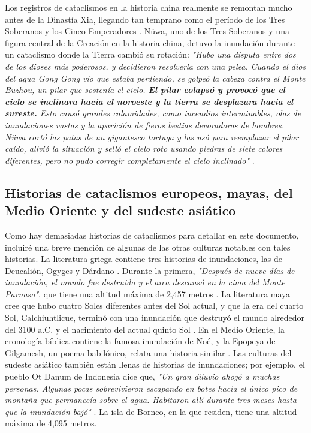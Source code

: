 \documentclass[10pt,twocolumn,letterpaper]{article}
\begin{document}
Los registros de cataclismos en la historia china realmente se remontan mucho antes de la Dinastía Xia, llegando tan temprano como el período de los Tres Soberanos y los Cinco Emperadores \cite{7}. Nüwa, uno de los Tres Soberanos y una figura central de la Creación en la historia china, detuvo la inundación durante un cataclismo donde la Tierra cambió su rotación: \textit{"Hubo una disputa entre dos de los dioses más poderosos, y decidieron resolverla con una pelea. Cuando el dios del agua Gong Gong vio que estaba perdiendo, se golpeó la cabeza contra el Monte Buzhou, un pilar que sostenía el cielo. \textbf{El pilar colapsó y provocó que el cielo se inclinara hacia el noroeste y la tierra se desplazara hacia el sureste.} Esto causó grandes calamidades, como incendios interminables, olas de inundaciones vastas y la aparición de fieros bestias devoradoras de hombres. Nüwa cortó las patas de un gigantesco tortuga y las usó para reemplazar el pilar caído, alivió la situación y selló el cielo roto usando piedras de siete colores diferentes, pero no pudo corregir completamente el cielo inclinado"} \cite{8}.

\subsection{Historias de cataclismos europeos, mayas, del Medio Oriente y del sudeste asiático}

Como hay demasiadas historias de cataclismos para detallar en este documento, incluiré una breve mención de algunas de las otras culturas notables con tales historias. La literatura griega contiene tres historias de inundaciones, las de Deucalión, Ogyges y Dárdano \cite{9,10}. Durante la primera, \textit{"Después de nueve días de inundación, el mundo fue destruido y el arca descansó en la cima del Monte Parnaso"}, que tiene una altitud máxima de 2,457 metros \cite{11}. La literatura maya cree que hubo cuatro Soles diferentes antes del Sol actual, y que la era del cuarto Sol, Calchiuhtlicue, terminó con una inundación que destruyó el mundo alrededor del 3100 a.C. y el nacimiento del actual quinto Sol \cite{12}. En el Medio Oriente, la cronología bíblica contiene la famosa inundación de Noé, y la Epopeya de Gilgamesh, un poema babilónico, relata una historia similar \cite{13}. Las culturas del sudeste asiático también están llenas de historias de inundaciones; por ejemplo, el pueblo Ot Danum de Indonesia dice que, \textit{"Un gran diluvio ahogó a muchas personas. Algunas pocas sobrevivieron escapando en botes hacia el único pico de montaña que permanecía sobre el agua. Habitaron allí durante tres meses hasta que la inundación bajó"} \cite{3}. La isla de Borneo, en la que residen, tiene una altitud máxima de 4,095 metros.
\end{document}
